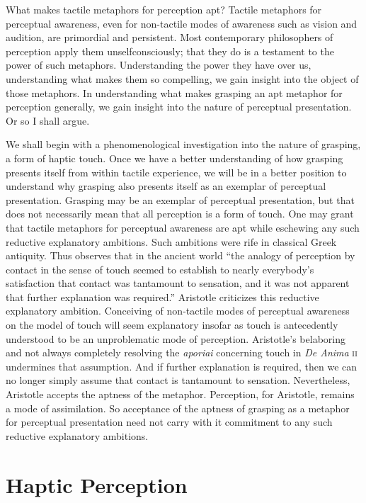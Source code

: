\documentclass[12pt]{article}
\begin{document}
What makes tactile metaphors for perception apt? Tactile metaphors for perceptual awareness, even for non-tactile modes of awareness such as vision and audition, are primordial and persistent. Most contemporary philosophers of perception apply them unselfconsciously; that they do is a testament to the power of such metaphors. Understanding the power they have over us, understanding what makes them so compelling, we gain insight into the object of those metaphors. In understanding what makes grasping an apt metaphor for perception generally, we gain insight into the nature of perceptual presentation. Or so I shall argue.

We shall begin with a phenomenological investigation into the nature of grasping, a form of haptic touch. Once we have a better understanding of how grasping presents itself from within tactile experience, we will be in a better position to understand why grasping also presents itself as an exemplar of perceptual presentation. Grasping may be an exemplar of perceptual presentation, but that does not necessarily mean that all perception is a form of touch. One may grant that tactile metaphors for perceptual awareness are apt while eschewing any such reductive explanatory ambitions. Such ambitions were rife in classical Greek antiquity. Thus \citet[39]{Lindberg:1977aa} observes that in the ancient world ``the analogy of perception by contact in the sense of touch seemed to establish to nearly everybody’s satisfaction that contact was tantamount to sensation, and it was not apparent that further explanation was required.'' Aristotle criticizes this reductive explanatory ambition. Conceiving of non-tactile modes of perceptual awareness on the model of touch will seem explanatory insofar as touch is antecedently understood to be an unproblematic mode of perception. Aristotle's belaboring and not always completely resolving the \emph{aporiai} concerning touch in \emph{De Anima} \textsc{ii} undermines that assumption. And if further explanation is required, then we can no longer simply assume that contact is tantamount to sensation. Nevertheless, Aristotle accepts the aptness of the metaphor. Perception, for Aristotle, remains a mode of assimilation. So acceptance of the aptness of grasping as a metaphor for perceptual presentation need not carry with it commitment to any such reductive explanatory ambitions.


\section{Haptic Perception} %
\label{sec:haptic_perception}
\end{document}
